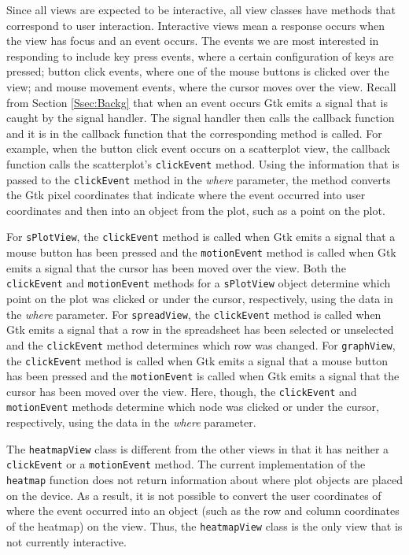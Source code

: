 \documentclass{article}[11pt]
\newcommand{\Rfunction}[1]{{\texttt{#1}}}
\newcommand{\Robject}[1]{{\texttt{#1}}}
\newcommand{\Rslot}[1]{\textsl{#1}}
\begin{document}
Since all views are expected to be interactive, all view classes have methods
that correspond to user interaction.  Interactive views mean a response
occurs when the view has focus and an event occurs.  The events we are most
interested in responding to include key press
events, where a certain configuration of keys are pressed; button click
events, where one of the mouse buttons is clicked over the view; and mouse
movement events, where the cursor moves over the view.  Recall from Section
\ref{Ssec:Backg} that when an event occurs Gtk emits a signal that is caught
by the signal handler.  The signal handler then calls the callback function
and it is in the callback function that the corresponding method is called.
For example, when the button click event occurs on a scatterplot view, the
callback function calls the scatterplot's \Rfunction{clickEvent} method.
Using the information that is passed to the \Rfunction{clickEvent} method in
the \Rslot{where} parameter, the method converts the Gtk pixel coordinates
that indicate where the event occurred into user coordinates and then into an
object from the plot, such as a point on the plot. 

For \Robject{sPlotView}, the \Rfunction{clickEvent} method is called when Gtk
emits a signal that a mouse button has been pressed and the
\Rfunction{motionEvent} method is called when Gtk emits a signal that
the cursor has been moved over the view.  Both the \Rfunction{clickEvent} and
\Rfunction{motionEvent} methods for a \Robject{sPlotView} object
determine which point on the plot was clicked or under the cursor,
respectively, using the data in the \Rslot{where} parameter.  For
\Robject{spreadView}, the \Rfunction{clickEvent} method is called when Gtk
emits a signal that a row in the spreadsheet has been selected or unselected
and the \Rfunction{clickEvent} method determines which row was changed.
For \Robject{graphView}, the \Rfunction{clickEvent} method is called when Gtk
emits a signal that a mouse button has been pressed and the
\Rfunction{motionEvent} is called when Gtk emits a signal that the cursor has
been moved over the view.  Here, though, the \Rfunction{clickEvent} and
\Rfunction{motionEvent} methods determine which node was clicked or under
the cursor, respectively, using the data in the \Rslot{where} parameter.  

The \Robject{heatmapView} class is different from the other views in that it
has neither a \Rfunction{clickEvent} or a \Rfunction{motionEvent} method.  The
current implementation of the \Rfunction{heatmap} function does not return
information about where plot objects are placed on the device.  As a result,
it is not possible to convert the user coordinates of where the event occurred
into an object (such as the row and column coordinates of the heatmap) on
the view.  Thus, the \Robject{heatmapView} class is the only view that is not
currently interactive.  
\end{document}

